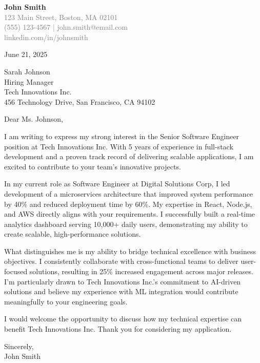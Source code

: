 \documentclass[11pt,letterpaper]{article}
\begin{document}
\begin{center}
    \textbf{\Large John Smith} \\
    \textcolor{gray}{\small 123 Main Street, Boston, MA 02101} \\
    \textcolor{gray}{\small (555) 123-4567 | john.smith@email.com} \\
    \textcolor{gray}{\small linkedin.com/in/johnsmith}
\end{center}

\vspace{4mm}

June 21, 2025

\vspace{3mm}

Sarah Johnson \\
Hiring Manager \\
Tech Innovations Inc. \\
456 Technology Drive, San Francisco, CA 94102

\vspace{3mm}

Dear Ms. Johnson,

\vspace{3mm}

I am writing to express my strong interest in the Senior Software Engineer position at Tech Innovations Inc. With 5 years of experience in full-stack development and a proven track record of delivering scalable applications, I am excited to contribute to your team's innovative projects.

\vspace{3mm}

In my current role as Software Engineer at Digital Solutions Corp, I led development of a microservices architecture that improved system performance by 40\% and reduced deployment time by 60\%. My expertise in React, Node.js, and AWS directly aligns with your requirements. I successfully built a real-time analytics dashboard serving 10,000+ daily users, demonstrating my ability to create scalable, high-performance solutions.

\vspace{3mm}

What distinguishes me is my ability to bridge technical excellence with business objectives. I consistently collaborate with cross-functional teams to deliver user-focused solutions, resulting in 25\% increased engagement across major releases. I'm particularly drawn to Tech Innovations Inc.'s commitment to AI-driven solutions and believe my experience with ML integration would contribute meaningfully to your engineering goals.

\vspace{3mm}

I would welcome the opportunity to discuss how my technical expertise can benefit Tech Innovations Inc. Thank you for considering my application.

\vspace{4mm}

Sincerely, \\
\vspace{6mm}
John Smith
\end{document}
